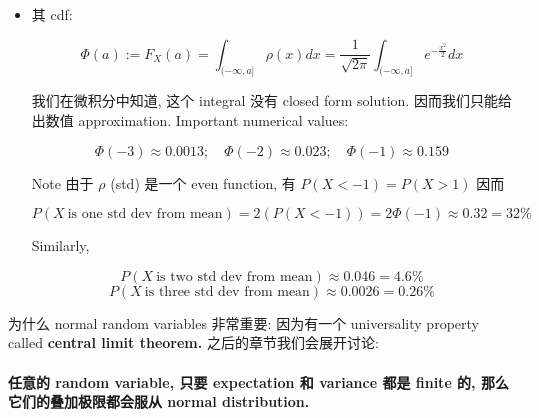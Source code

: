 \documentclass{qlnotes-export}
\begin{document}
\begin{itemize}
  \[\begin{matrix}
  {{\mathbb{E}}\lbrack X^{k}\rbrack} & {= \frac{1}{\sqrt{2\pi}}\int_{\mathbb{R}}x^{k - 1}(xe^{- \frac{x^{2}}{2}}) dx} \\
   & {= - \frac{1}{\sqrt{2\pi}}\int_{\mathbb{R}}x^{k - 1}(e^{- \frac{x^{2}}{2}})' dx} \\
   & {= 0 + \frac{1}{\sqrt{2\pi}}\int_{\mathbb{R}}(x^{k - 1})'e^{- \frac{x^{2}}{2}} dx} \\
   & {= \frac{k - 1}{\sqrt{2\pi}}\int_{\mathbb{R}}x^{k - 2}e^{- \frac{x^{2}}{2}} dx} \\
   & {= (k - 1){\mathbb{E}}\lbrack X^{k - 2}\rbrack}
  \end{matrix}\]

  从而:

  \[\begin{matrix}
  {{\mathbb{E}}\lbrack X^{k}\rbrack = \{ 0,\quad k = 2j - 1} \\
  {(2j - 1)(2j - 3)\cdots 1 = \frac{(2j)!}{2^{j}j!},\quad k = 2j}
  \end{matrix}\]
\item
  其 cdf:

  \[\Phi(a) := F_{X}(a) = \int_{( - \infty,a\rbrack}\rho(x) dx = \frac{1}{\sqrt{2\pi}}\int_{( - \infty,a\rbrack}e^{- \frac{x^{2}}{2}} dx\]

  我们在微积分中知道, 这个 integral 没有 closed form solution. 因而我们只能给出数值 approximation. Important numerical values:

  \[\Phi( - 3) \approx 0.0013;\quad\Phi( - 2) \approx 0.023;\quad\Phi( - 1) \approx 0.159\]

  Note 由于 \(\rho\) (std) 是一个 even function, 有 \(P(X < - 1) = P(X > 1)\) 因而

  \[P(X\ \text{is one std dev from mean}) = 2(P(X < - 1)) = 2\Phi( - 1) \approx 0.32 = 32\%\]

  Similarly,

  \[P(X\ \text{is two std dev from mean}) \approx 0.046 = 4.6\%\]\[P(X\ \text{is three std dev from mean}) \approx 0.0026 = 0.26\%\]
\end{itemize}

为什么 normal random variables 非常重要: 因为有一个 universality property called \textbf{central limit theorem.} 之后的章节我们会展开讨论:

\paragraph{\texorpdfstring{任意的 random variable, 只要 expectation 和 variance 都是 finite 的, 那么它们的叠加极限都会服从 normal distribution.\\
}{任意的 random variable, 只要 expectation 和 variance 都是 finite 的, 那么它们的叠加极限都会服从 normal distribution. }}\label{ux4efbux610fux7684-random-variable-ux53eaux8981-expectation-ux548c-variance-ux90fdux662f-finite-ux7684-ux90a3ux4e48ux5b83ux4eecux7684ux53e0ux52a0ux6781ux9650ux90fdux4f1aux670dux4ece-normal-distribution.}
\end{document}
